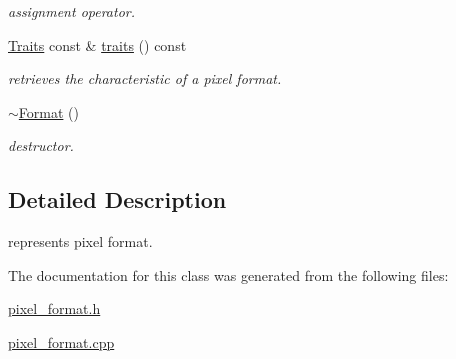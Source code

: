\begin{DoxyCompactItemize}
\begin{DoxyCompactList}\small\item\em assignment operator. \end{DoxyCompactList}\item 
\hypertarget{classhryky_1_1pixel_1_1_format_a996feea3534e20ea7feac5d72a99b4c7}{\hyperlink{structhryky_1_1pixel_1_1_format_1_1_traits}{Traits} const \& \hyperlink{classhryky_1_1pixel_1_1_format_a996feea3534e20ea7feac5d72a99b4c7}{traits} () const }\label{classhryky_1_1pixel_1_1_format_a996feea3534e20ea7feac5d72a99b4c7}

\begin{DoxyCompactList}\small\item\em retrieves the characteristic of a pixel format. \end{DoxyCompactList}\item 
\hypertarget{classhryky_1_1pixel_1_1_format_a1f8560dae7a81e3a08b822b602c90c61}{\hyperlink{classhryky_1_1pixel_1_1_format_a1f8560dae7a81e3a08b822b602c90c61}{$\sim$\-Format} ()}\label{classhryky_1_1pixel_1_1_format_a1f8560dae7a81e3a08b822b602c90c61}

\begin{DoxyCompactList}\small\item\em destructor. \end{DoxyCompactList}\end{DoxyCompactItemize}


\subsection{Detailed Description}
represents pixel format. 

The documentation for this class was generated from the following files\-:\begin{DoxyCompactItemize}
\item 
\hyperlink{pixel__format_8h}{pixel\-\_\-format.\-h}\item 
\hyperlink{pixel__format_8cpp}{pixel\-\_\-format.\-cpp}\end{DoxyCompactItemize}
